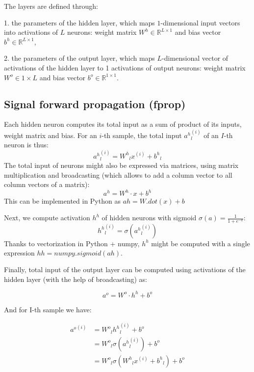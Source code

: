 \documentclass[]{article}
\theoremstyle{definition}
\begin{document}
The layers are defined through:

1. the parameters of the hidden layer, which maps $1$-dimensional input vectors
into activations of $L$ neurons:
weight matrix $W^h\in\mathbb{R}^{L\times 1	}$ and bias vector
$b^h\in\mathbb{R}^{L\times 1}$,

2. the parameters of the output layer, which maps $L$-dimensional vector
of activations of the hidden layer to 1 activations of output neurons:
weight matrix $W^o\in{1\times L}$ and bias vector $b^o\in\mathbb{R}^{1\times 1}$.


\subsection{Signal forward propagation (fprop)}

Each hidden neuron computes its total input as a sum of product of its
inputs, weight matrix and bias. For an $i$-th sample,
the total input
${a^{h}}^{(i)}_l $ of an $I$-th neuron is thus:
\begin{equation}
{a^h}^{(i)}_l = {W^h}_{l}x^{(i)} + {b^h}_l
\end{equation}
The total input of neurons might also be expressed via matrices,
using matrix multiplication and broadcasting (which allows to add
a column vector to all column vectors of a matrix):
\begin{equation}
{a^h} = W^h\cdot x + b^h
\end{equation}
This can be implemented in Python as $ah = W.dot(x) + b$

Next, we compute activation $h^h$ of hidden neurons with sigmoid
$\sigma(a) = \frac{1}{1+e^{-a}}$:
\begin{equation}
{h^h}^{(i)}_l=\sigma({a^h}^{(i)}_l)
\end{equation}
Thanks to vectorization in Python + numpy, $h^h$ might be computed with a single
expression $hh = numpy.sigmoid(ah)$.

Finally, total input of the output layer can be computed using
activations of the hidden layer (with the help of broadcasting) as:


\begin{equation}
a^o = W^o\cdot h^h + b^o
\end{equation}

And for I-th sample we have:

\begin{equation}
\begin{split}
{a^o}^{(i)} &= {W^o}_l{h^h}^{(i)}_l + {b^o} \\
& = {W^o}_l\sigma({a^h}^{(i)}_l) + {b^o} \\
& = {W^o}_l\sigma({W^h}_{l}x^{(i)} + {b^h}_l) + {b^o}
\end{split}
\end{equation}
\end{document}
